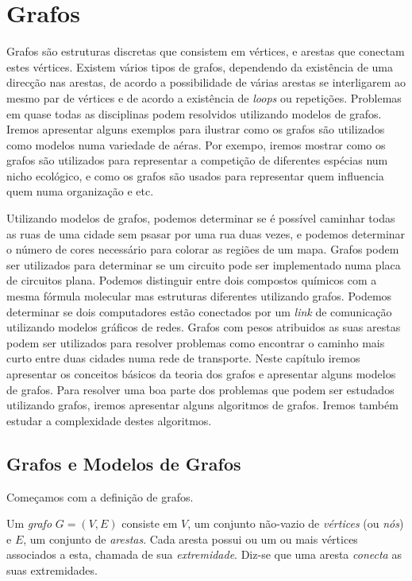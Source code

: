\chapter{Grafos}
\label{cap:grafos}

Grafos são estruturas discretas que consistem em vértices, e arestas que
conectam estes vértices. Existem vários tipos de grafos, dependendo da
existência de uma direcção nas arestas, de acordo a possibilidade de várias
arestas se interligarem ao mesmo par de vértices e de acordo a existência de
\emph{loops} ou repetições.
Problemas em quase todas as disciplinas podem resolvidos utilizando modelos de
grafos. Iremos apresentar alguns exemplos para ilustrar como os grafos são
utilizados como modelos numa variedade de aéras. Por exempo, iremos mostrar como
os grafos são utilizados para representar a competição de diferentes espécias
num nicho ecológico, e como os grafos são usados para representar quem
influencia quem numa organização e etc.

Utilizando modelos de grafos, podemos determinar se é possível caminhar todas as
ruas de uma cidade sem psasar por uma rua duas vezes, e podemos determinar o
número de cores necessário para colorar as regiões de um mapa. Grafos podem ser
utilizados para determinar se um circuito pode ser implementado numa placa de
circuitos plana. Podemos distinguir entre dois compostos químicos com a mesma
fórmula molecular mas estruturas diferentes utilizando grafos. Podemos
determinar se dois computadores estão conectados por um \emph{link} de
comunicação utilizando modelos gráficos de redes. Grafos com pesos atribuidos as
suas arestas podem ser utilizados para resolver problemas como encontrar o
caminho mais curto entre duas cidades numa rede de transporte. Neste capítulo
iremos apresentar os conceitos básicos da teoria dos grafos e apresentar alguns
modelos de grafos. Para resolver uma boa parte dos problemas que podem ser
estudados utilizando grafos, iremos apresentar alguns algoritmos de grafos.
Iremos também estudar a complexidade destes algoritmos.

\section{Grafos e Modelos de Grafos}

Começamos com a definição de grafos.
\begin{defn}
\label{def51}
Um \emph{grafo} $G = (V,E)$ consiste em $V$, um conjunto não-vazio de
\emph{vértices} (ou \emph{nós}) e $E$, um conjunto de \emph{arestas}. Cada
aresta possui ou um ou mais vértices associados a esta, chamada de sua
\emph{extremidade}. Diz-se que uma aresta \emph{conecta} as suas extremidades.
\end{defn}

